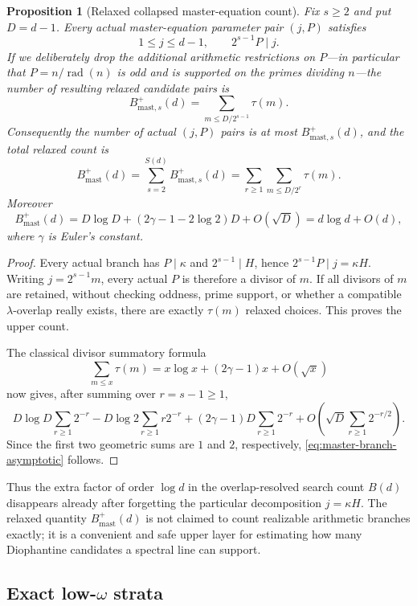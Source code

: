 \documentclass[11pt]{article}
\newtheorem{proposition}[theorem]{Proposition}
\newcommand{\rad}{\operatorname{rad}}
\begin{document}
\begin{proposition}[Relaxed collapsed master-equation count]
\label{prop:master-branch-asymptotic}
Fix $s\ge2$ and put $D=d-1$.  Every actual master-equation parameter pair
$(j,P)$ satisfies
\[
1\le j\le d-1,
\qquad
2^{s-1}P\mid j.
\]
If we deliberately drop the additional arithmetic restrictions on $P$---in
particular that $P=n/\rad(n)$ is odd and is supported on the primes dividing
$n$---the number of resulting \emph{relaxed} candidate pairs is
\[
B^{+}_{\mathrm{mast},s}(d)=
\sum_{m\le D/2^{s-1}}\tau(m).
\]
Consequently the number of actual $(j,P)$ pairs is at most
$B^{+}_{\mathrm{mast},s}(d)$, and the total relaxed count is
\[
B^{+}_{\mathrm{mast}}(d)
=\sum_{s=2}^{S(d)}B^{+}_{\mathrm{mast},s}(d)
=\sum_{r\ge1}\sum_{m\le D/2^r}\tau(m).
\]
Moreover
\begin{equation}
\boxed{
B^{+}_{\mathrm{mast}}(d)
=D\log D+(2\gamma-1-2\log2)D+O(\sqrt D)
=d\log d+O(d),
}
\label{eq:master-branch-asymptotic}
\end{equation}
where $\gamma$ is Euler's constant.
\end{proposition}

\begin{proof}
Every actual branch has $P\mid\kappa$ and $2^{s-1}\mid H$, hence
$2^{s-1}P\mid j=\kappa H$.  Writing $j=2^{s-1}m$, every actual $P$ is
therefore a divisor of $m$.  If all divisors of $m$ are retained, without
checking oddness, prime support, or whether a compatible $\lambda$-overlap
really exists, there are exactly $\tau(m)$ relaxed choices.  This proves the
upper count.

The classical divisor summatory formula
\[
\sum_{m\le x}\tau(m)
=x\log x+(2\gamma-1)x+O(\sqrt x)
\]
now gives, after summing over $r=s-1\ge1$,
\[
D\log D\sum_{r\ge1}2^{-r}
-D\log2\sum_{r\ge1}r2^{-r}
+(2\gamma-1)D\sum_{r\ge1}2^{-r}
+O\!\left(\sqrt D\sum_{r\ge1}2^{-r/2}\right).
\]
Since the first two geometric sums are $1$ and $2$, respectively,
\eqref{eq:master-branch-asymptotic} follows.
\end{proof}

Thus the extra factor of order $\log d$ in the overlap-resolved search count
$B(d)$ disappears already after forgetting the particular decomposition
$j=\kappa H$.  The relaxed quantity $B^{+}_{\mathrm{mast}}(d)$ is not claimed
to count realizable arithmetic branches exactly; it is a convenient and safe
upper layer for estimating how many Diophantine candidates a spectral line can
support.

\subsection{Exact low-$\omega$ strata}
\end{document}
